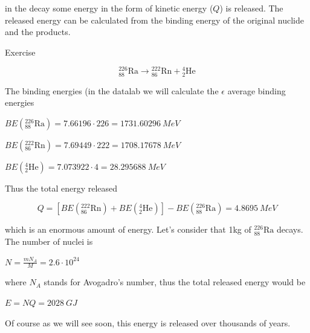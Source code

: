 \noindent in the decay some energy in the form of kinetic energy ($Q$) is released. The released energy can be calculated from the binding energy of the original nuclide and the products.

\begin{tcolorbox}
Exercise

$${}_{88}^{226}\text{Ra}\rightarrow {}_{86}^{222}\text{Rn}+{}_{2}^{4}\text{He}$$

The binding energies (in the datalab we will calculate the $\epsilon$ average binding energies

$BE({}_{88}^{226}\text{Ra})=7.66196\cdot 226=1731.60296 \: MeV$

$BE({}_{86}^{222}\text{Rn})=7.69449\cdot 222=1708.17678 \: MeV$

$BE({}_{2}^{4}\text{He})=7.073922\cdot 4=28.295688 \: MeV$

Thus the total energy released

$$Q=[BE({}_{86}^{222}\text{Rn})+BE({}_{2}^{4}\text{He})]-BE({}_{88}^{226}\text{Ra})=4.8695 \: MeV$$

which is an enormous amount of energy. Let's consider that 1kg of ${}_{88}^{226}\text{Ra}$ decays. The number of nuclei is

$N=\frac{mN_A}{M}=2.6\cdot 10^{24}$

\noindent where $N_A$ stands for Avogadro's number, thus the total released energy would be

$E=NQ=2028 \: GJ$

Of course as we will see soon, this energy is released over thousands of years.
\end{tcolorbox}



